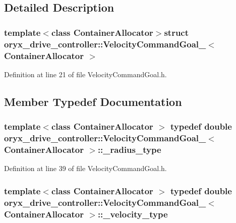 \subsection{\-Detailed \-Description}
\subsubsection*{template$<$class Container\-Allocator$>$struct oryx\-\_\-drive\-\_\-controller\-::\-Velocity\-Command\-Goal\-\_\-$<$ Container\-Allocator $>$}



\-Definition at line 21 of file \-Velocity\-Command\-Goal.\-h.



\subsection{\-Member \-Typedef \-Documentation}
\subsubsection[{\-\_\-radius\-\_\-type}]{\setlength{\rightskip}{0pt plus 5cm}template$<$class Container\-Allocator $>$ typedef double {\bf oryx\-\_\-drive\-\_\-controller\-::\-Velocity\-Command\-Goal\-\_\-}$<$ \-Container\-Allocator $>$\-::{\bf \-\_\-radius\-\_\-type}}\label{structoryx__drive__controller_1_1VelocityCommandGoal___aae6f1922a3213ef048e198d7eaceca1f}


\-Definition at line 39 of file \-Velocity\-Command\-Goal.\-h.

\subsubsection[{\-\_\-velocity\-\_\-type}]{\setlength{\rightskip}{0pt plus 5cm}template$<$class Container\-Allocator $>$ typedef double {\bf oryx\-\_\-drive\-\_\-controller\-::\-Velocity\-Command\-Goal\-\_\-}$<$ \-Container\-Allocator $>$\-::{\bf \-\_\-velocity\-\_\-type}}\label{structoryx__drive__controller_1_1VelocityCommandGoal___aa88ac88be601440ccc07013825a1c80f}


